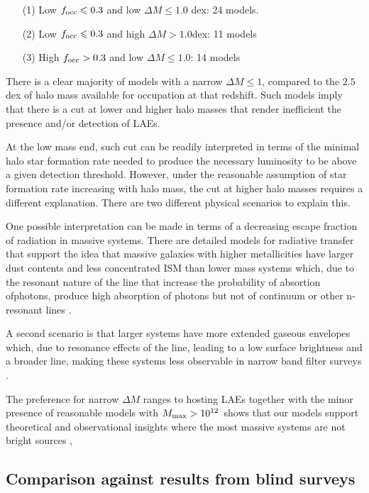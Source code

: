 \documentclass[usenatbib]{mn2e}
\newcommand{\ly}{{\ifmmode{{\rm Ly}\alpha}\else{Ly$\alpha$~}\fi}}
\newcommand{\hMsun}{{\ifmmode{h^{-1}{\rm
        {M_{\odot}}}}\else{$h^{-1}{\rm{M_{\odot}}}$}\fi}}
\begin{document}
\begin{itemize}
\item[(1)] Low $f_{\rm occ}\leq 0.3$ and low $\Delta M\leq 1.0$
  dex: 24 models.
\item[(2)] Low $f_{\rm occ}\leq 0.3$ and high $\Delta M > 1.0$dex: 11
  models
\item[(3)] High $f_{\rm occ}> 0.3$ and low $\Delta M\leq 1.0$: 14 models
\end{itemize}

There is a clear majority of models with a narrow $\Delta M\leq
1$, compared to the $2.5$dex of halo mass available for occupation at
that redshift. Such models imply that there is a cut at lower and higher halo
masses that render inefficient the presence and/or detection of LAEs.

At the low mass end, such cut can be readily interpreted in terms of the
minimal halo star formation rate needed to produce the necessary \ly 
luminosity to be above a given detection threshold.  However, under
the reasonable assumption of star formation rate increasing with halo
mass, the cut at higher halo masses requires a different
explanation. There are two different physical scenarios to explain
this. 

One possible interpretation can be made in terms of a decreasing escape
fraction of \ly radiation in massive systems. There are detailed models for
radiative transfer that support the idea that massive galaxies with
higher metallicities have larger dust contents and less concentrated
ISM than lower mass systems which, due to the resonant nature of the
\ly line that increase the probability of absortion  of\ly photons, produce
high absorption of \ly photons but not of continuum or
other n-resonant lines \citep{Laursen2009,ForeroRomero2011}.  

A second scenario is that larger systems have more extended gaseous
envelopes which, due to resonance effects of the \ly line, leading to
a low surface brightness and a broader line, making these systems less
observable in narrow band filter surveys \citep{Zheng2010}. 

The preference for narrow $\Delta M$ ranges to hosting LAEs together
with the minor presence of reasonable models with $M_{\rm max}>
10^{12}$\hMsun \  shows that our models support theoretical and observational
insights where the most massive systems are not bright \ly sources
\citep{ForeroRomero2012}, \citep{Shapley2003}

\subsection{Comparison against results from blind surveys}
\end{document}
